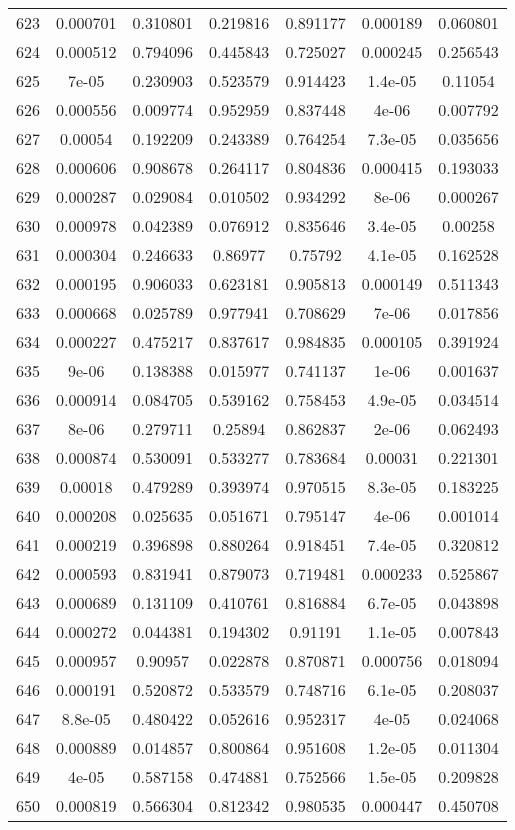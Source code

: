 \begin{table}
\begin{tabular}{c|c|c|c|c|c|c}
623 & 0.000701 & 0.310801 & 0.219816 & 0.891177 & 0.000189 & 0.060801\\
624 & 0.000512 & 0.794096 & 0.445843 & 0.725027 & 0.000245 & 0.256543\\
625 & 7e-05 & 0.230903 & 0.523579 & 0.914423 & 1.4e-05 & 0.11054\\
626 & 0.000556 & 0.009774 & 0.952959 & 0.837448 & 4e-06 & 0.007792\\
627 & 0.00054 & 0.192209 & 0.243389 & 0.764254 & 7.3e-05 & 0.035656\\
628 & 0.000606 & 0.908678 & 0.264117 & 0.804836 & 0.000415 & 0.193033\\
629 & 0.000287 & 0.029084 & 0.010502 & 0.934292 & 8e-06 & 0.000267\\
630 & 0.000978 & 0.042389 & 0.076912 & 0.835646 & 3.4e-05 & 0.00258\\
631 & 0.000304 & 0.246633 & 0.86977 & 0.75792 & 4.1e-05 & 0.162528\\
632 & 0.000195 & 0.906033 & 0.623181 & 0.905813 & 0.000149 & 0.511343\\
633 & 0.000668 & 0.025789 & 0.977941 & 0.708629 & 7e-06 & 0.017856\\
634 & 0.000227 & 0.475217 & 0.837617 & 0.984835 & 0.000105 & 0.391924\\
635 & 9e-06 & 0.138388 & 0.015977 & 0.741137 & 1e-06 & 0.001637\\
636 & 0.000914 & 0.084705 & 0.539162 & 0.758453 & 4.9e-05 & 0.034514\\
637 & 8e-06 & 0.279711 & 0.25894 & 0.862837 & 2e-06 & 0.062493\\
638 & 0.000874 & 0.530091 & 0.533277 & 0.783684 & 0.00031 & 0.221301\\
639 & 0.00018 & 0.479289 & 0.393974 & 0.970515 & 8.3e-05 & 0.183225\\
640 & 0.000208 & 0.025635 & 0.051671 & 0.795147 & 4e-06 & 0.001014\\
641 & 0.000219 & 0.396898 & 0.880264 & 0.918451 & 7.4e-05 & 0.320812\\
642 & 0.000593 & 0.831941 & 0.879073 & 0.719481 & 0.000233 & 0.525867\\
643 & 0.000689 & 0.131109 & 0.410761 & 0.816884 & 6.7e-05 & 0.043898\\
644 & 0.000272 & 0.044381 & 0.194302 & 0.91191 & 1.1e-05 & 0.007843\\
645 & 0.000957 & 0.90957 & 0.022878 & 0.870871 & 0.000756 & 0.018094\\
646 & 0.000191 & 0.520872 & 0.533579 & 0.748716 & 6.1e-05 & 0.208037\\
647 & 8.8e-05 & 0.480422 & 0.052616 & 0.952317 & 4e-05 & 0.024068\\
648 & 0.000889 & 0.014857 & 0.800864 & 0.951608 & 1.2e-05 & 0.011304\\
649 & 4e-05 & 0.587158 & 0.474881 & 0.752566 & 1.5e-05 & 0.209828\\
650 & 0.000819 & 0.566304 & 0.812342 & 0.980535 & 0.000447 & 0.450708\\
\end{tabular}
\end{table}
